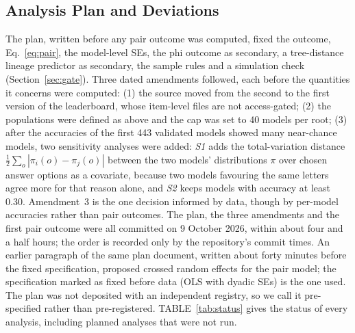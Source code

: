 \documentclass{ieeeaccess}
\theoremstyle{definition}
\theoremstyle{plain}
\begin{document}
\subsection{Analysis Plan and Deviations}
\label{sec:plan}
The plan, written before any pair outcome was computed, fixed the outcome, Eq.~\eqref{eq:pair}, the model-level SEs, the phi outcome as secondary, a tree-distance lineage predictor as secondary, the sample rules and a simulation check (Section~\ref{sec:gate}). Three dated amendments followed, each before the quantities it concerns were computed: (1) the source moved from the second to the first version of the leaderboard, whose item-level files are not access-gated; (2) the populations were defined as above and the cap was set to 40 models per root; (3) after the accuracies of the first 443 validated models showed many near-chance models, two sensitivity analyses were added: \emph{S1} adds the total-variation distance $\tfrac12\sum_{o}|\pi_i(o) - \pi_j(o)|$ between the two models' distributions $\pi$ over chosen answer options as a covariate, because two models favouring the same letters agree more for that reason alone, and \emph{S2} keeps models with accuracy at least 0.30. Amendment~3 is the one decision informed by data, though by per-model accuracies rather than pair outcomes. The plan, the three amendments and the first pair outcome were all committed on 9 October 2026, within about four and a half hours; the order is recorded only by the repository's commit times. An earlier paragraph of the same plan document, written about forty minutes before the fixed specification, proposed crossed random effects for the pair model; the specification marked as fixed before data (OLS with dyadic SEs) is the one used. The plan was not deposited with an independent registry, so we call it pre-specified rather than pre-registered. TABLE~\ref{tab:status} gives the status of every analysis, including planned analyses that were not run.
\end{document}
